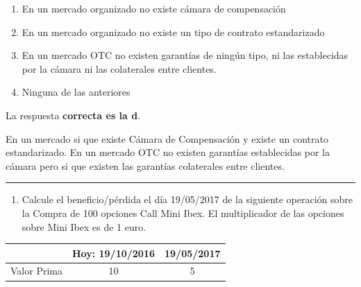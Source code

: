 \documentclass[
  letterpaper,
  DIV=11,
  numbers=noendperiod]{scrreprt}
\providecommand{\tightlist}{%
  \setlength{\itemsep}{0pt}\setlength{\parskip}{0pt}}\usepackage{longtable,booktabs,array}
\begin{document}
\begin{enumerate}
\def\labelenumi{\alph{enumi})}
\item
  En un mercado organizado no existe cámara de compensación
\item
  En un mercado organizado no existe un tipo de contrato estandarizado
\item
  En un mercado OTC no existen garantías de ningún tipo, ni las
  establecidas por la cámara ni las colaterales entre clientes.
\item
  Ninguna de las anteriores
\end{enumerate}

\begin{tcolorbox}[enhanced jigsaw, left=2mm, opacityback=0, colback=white, breakable, arc=.35mm, bottomrule=.15mm, rightrule=.15mm, toprule=.15mm, leftrule=.75mm, colframe=quarto-callout-tip-color-frame]
\begin{minipage}[t]{5.5mm}
\textcolor{quarto-callout-tip-color}{\faLightbulb}
\end{minipage}%
\begin{minipage}[t]{\textwidth - 5.5mm}

La respuesta \textbf{correcta es la d}.

En un mercado si que existe Cámara de Compensación y existe un contrato
estandarizado. En un mercado OTC no existen garantías establecidas por
la cámara pero si que existen las garantías colaterales entre clientes.

\end{minipage}%
\end{tcolorbox}

\begin{center}\rule{0.5\linewidth}{0.5pt}\end{center}

\begin{enumerate}
\def\labelenumi{\arabic{enumi}.}
\setcounter{enumi}{12}
\tightlist
\item
  Calcule el beneficio/pérdida el día 19/05/2017 de la siguiente
  operación sobre la Compra de 100 opciones Call Mini Ibex. El
  multiplicador de las opciones sobre Mini Ibex es de 1 euro.
\end{enumerate}

\begin{longtable}[]{@{}ccc@{}}
\toprule()
& Hoy: 19/10/2016 & 19/05/2017 \\
\midrule()
\endhead
Valor Prima & 10 & 5 \\
\bottomrule()
\end{longtable}
\end{document}
